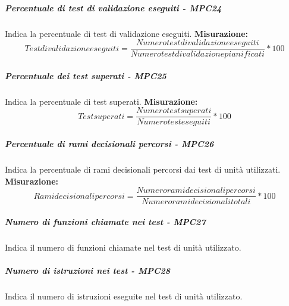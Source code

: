 \subparagraph{Percentuale di test di validazione eseguiti - MPC24}
Indica la percentuale di test di validazione eseguiti.
\textbf{Misurazione:}\begin{equation}
Test di validazione eseguiti = \frac{Numero test di validazione eseguiti}{Numero test di validazione pianificati} * 100
\end{equation}
\subparagraph{Percentuale dei test superati - MPC25}
Indica la percentuale di test superati.
\textbf{Misurazione:}\begin{equation}
Test superati = \frac{Numero test superati}{Numero test eseguiti} * 100
\end{equation}
\subparagraph{Percentuale di rami decisionali percorsi - MPC26}
Indica la percentuale di rami decisionali percorsi dai test di unità utilizzati.
\textbf{Misurazione:}\begin{equation}
Rami decisionali percorsi = \frac{Numero rami decisionali percorsi}{Numero rami decisionali totali} * 100
\end{equation}
\subparagraph{Numero di funzioni chiamate nei test - MPC27}
Indica il numero di funzioni chiamate nel test di unità utilizzato.
\subparagraph{Numero di istruzioni nei test - MPC28}
Indica il numero di istruzioni eseguite nel test di unità utilizzato.


